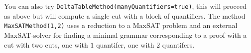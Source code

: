 \documentclass[a4paper,11pt]{article}
\begin{document}
You can also try \texttt{DeltaTableMethod(manyQuantifiers=true)}, this will proceed as above but will
compute a single cut with a block of quantifiers.  The method \texttt{MaxSATMethod(1,2)}
uses a reduction to a MaxSAT problem and an external MaxSAT-solver for finding a
minimal grammar corresponding to a proof with a cut with two cuts, one with $1$
quantifer, one with $2$ quantifers.


% 
% 
% 
\end{document}
